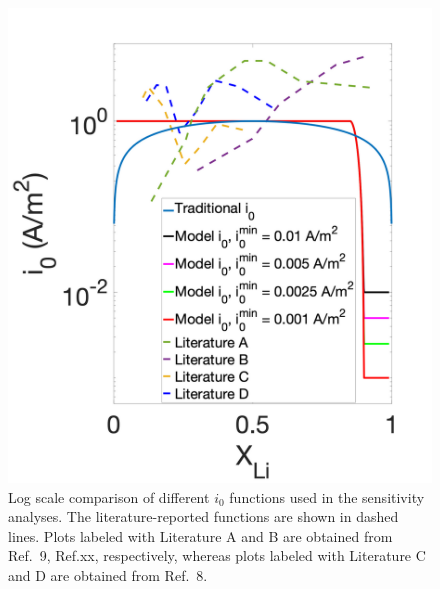 \documentclass{article}
\begin{document}
\begin{figure}
  \includegraphics{figures/i0_profiles.png}
  \caption{Log scale comparison of different $i_0$ functions used in
    the sensitivity analyses. The literature-reported functions are
    shown in dashed lines. Plots labeled with Literature A and B are
    obtained from  Ref.\ 9, Ref.xx, respectively, whereas plots labeled with
    Literature C and D are obtained from Ref.\ 8.}
  \label{fig:i0_profiles}
\end{figure}
\end{document}
